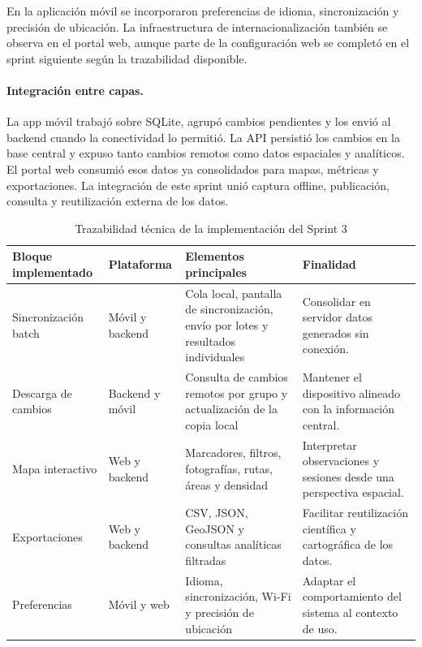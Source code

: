 En la aplicación móvil se incorporaron preferencias de idioma, sincronización y
precisión de ubicación. La infraestructura de internacionalización también se
observa en el portal web, aunque parte de la configuración web se completó en el
sprint siguiente según la trazabilidad disponible.

\paragraph{Integración entre capas.}
La app móvil trabajó sobre SQLite, agrupó cambios pendientes y los envió al
backend cuando la conectividad lo permitió. La API persistió los cambios en la
base central y expuso tanto cambios remotos como datos espaciales y analíticos.
El portal web consumió esos datos ya consolidados para mapas, métricas y
exportaciones. La integración de este sprint unió captura offline, publicación,
consulta y reutilización externa de los datos.

\begin{table}[H]
\centering
\caption{Trazabilidad técnica de la implementación del Sprint 3}
\label{tab:implementacion_sprint3}
\scriptsize
\renewcommand{\arraystretch}{1.12}
\begin{tabularx}{\textwidth}{p{3.1cm}p{2.2cm}XX}
\toprule
Bloque implementado & Plataforma & Elementos principales & Finalidad \\
\midrule
Sincronización batch & Móvil y backend & Cola local, pantalla de sincronización, envío por lotes y resultados individuales & Consolidar en servidor datos generados sin conexión. \\
Descarga de cambios & Backend y móvil & Consulta de cambios remotos por grupo y actualización de la copia local & Mantener el dispositivo alineado con la información central. \\
Mapa interactivo & Web y backend & Marcadores, filtros, fotografías, rutas, áreas y densidad & Interpretar observaciones y sesiones desde una perspectiva espacial. \\
Exportaciones & Web y backend & CSV, JSON, GeoJSON y consultas analíticas filtradas & Facilitar reutilización científica y cartográfica de los datos. \\
Preferencias & Móvil y web & Idioma, sincronización, Wi-Fi y precisión de ubicación & Adaptar el comportamiento del sistema al contexto de uso. \\
\bottomrule
\end{tabularx}
\end{table}

